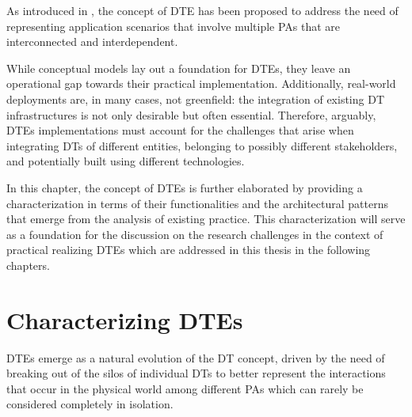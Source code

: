 As introduced in , the concept of \acl{DTE} has been proposed to address the need of representing application scenarios that involve multiple \acp{PA} that are interconnected and interdependent.

While conceptual models lay out a foundation for \acp{DTE}, they leave an operational gap towards their practical implementation.
%
Additionally, real-world deployments are, in many cases, not greenfield: the integration of existing \ac{DT} infrastructures is not only desirable but often essential. 
%
Therefore, arguably, \acp{DTE} implementations must account for the challenges that arise when integrating \acp{DT} of different entities, belonging to possibly different stakeholders, and potentially built using different technologies.

In this chapter, the concept of \aclp{DTE} is further elaborated by providing a characterization in terms of their functionalities and the architectural patterns that emerge from the analysis of existing practice. 
%
This characterization will serve as a foundation for the discussion on the research challenges in the context of practical realizing \acp{DTE} which are addressed in this thesis in the following chapters.



\section{Characterizing \aclp{DTE}}
\label{sec:dte:dte:ecosystems}

\acp{DTE} emerge as a natural evolution of the \ac{DT} concept, driven by the need of breaking out of the silos of individual \acp{DT} to better represent the interactions that occur in the physical world among different \acp{PA} which can rarely be considered completely in isolation. 

